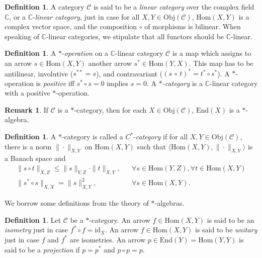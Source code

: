 \documentclass[12pt]{article}
\newcommand{\norm}[1]{\| #1\|}
\theoremstyle{definition}
\theoremstyle{definition}
\newtheorem{defn}[thm]{Definition}
\newtheorem{note}[thm]{Remark}
\theoremstyle{remark}
\newcommand{\Obj}{\mathrm{Obj}}
\def\2#1{{\mathcal #1}}
\def\7#1{{\mathbb #1}}
\newcommand{\Hom}{\mathrm{Hom}}
\newcommand{\End}{\mathrm{End}}
\newcommand{\mcirc}{\circ}
\def\id{\mathrm{id}}
\begin{document}
\begin{defn} A category $\2C$ is said to be a \emph{linear category} over the complex
  field $\mathbb{C}$, or a $\7C$-\emph{linear category}, just in case for all $X,Y\in
  \Obj (\2C )$, $\Hom (X,Y)$ is a complex vector space, and the composition $\circ$
  of morphisms is bilinear.  When speaking of $\7C$-linear categories, we stipulate
  that all functors should be $\mathbb{C}$-linear.
\end{defn}

\begin{defn} A $*$-\emph{operation} on a $\7C$-linear category $\2C$ is a map which
  assigns to an arrow $s\in\Hom(X,Y)$ another arrow $s^*\in\Hom(Y,X)$.  This map has
  to be antilinear, involutive ($s^{**}=s$), and contravariant ($(s\,\circ\,
  t)^*=t^*\mcirc s^*$).  A $*$-operation is \emph{positive} iff $s^*\mcirc s=0$
  implies $s=0$. A \emph{$*$-category} is a $\7C$-linear category with a positive
  $*$-operation. \end{defn}

\begin{note} If $\2C$ is a $*$-category, then for each $X\in \Obj (\2C )$, $\End (X)$
  is a $*$-algebra.  \end{note}

\begin{defn} A $*$-category is called a $C^*$-\emph{category} if for all $X,Y\in \Obj
  (\2C )$, there is a norm $\norm{\cdot }_{X,Y}$ on $\Hom (X,Y)$ such that $\langle
  \Hom (X,Y),\norm{\cdot }_{X,Y}\rangle$ is a Banach space and \[ \begin{array}{lll}
    \norm{s\circ t}_{X,Z} \leq \norm{s}_{Y,Z}\cdot \norm{t}_{X,Y}, & & \forall s\in
    \Hom (Y,Z) ,\forall t\in
    \Hom (X,Y) \\
    \norm{s^*\circ s}_{X,X}=\norm{s}_{X,Y}^2 ,& & \forall s\in \Hom (X,Y)
    .\end{array} \]
\end{defn} 

We borrow some definitions from the theory of $*$-algebras.

\begin{defn} Let $\2C$ be a $*$-category.  An arrow
  $f\in \Hom (X,Y)$ is said to be an \emph{isometry}
  just in case $f^*\circ f=\id _X$.  An arrow $f\in
  \Hom (X,Y)$ is said to be \emph{unitary} just in case
  $f$ and $f^*$ are isometries.  An arrow $p\in
  \End (Y)=\Hom (Y,Y)$ is said to be a \emph{projection} if $p=p^*$ and $p\circ p=p$.
\end{defn}
\end{document}
